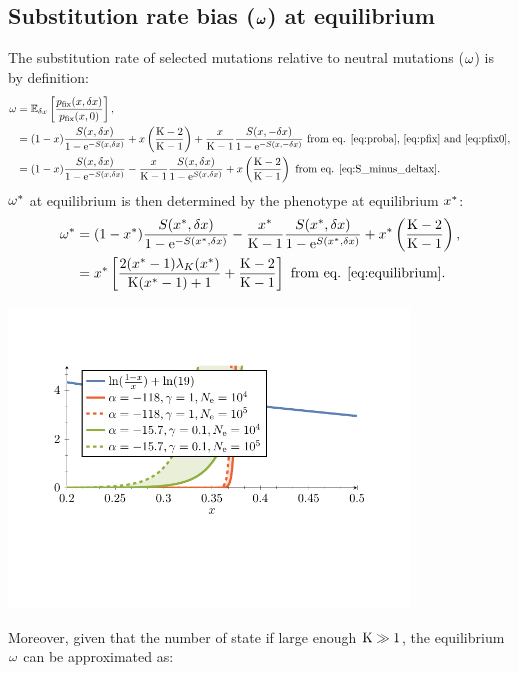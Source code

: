 \documentclass{article}
\begin{document}
\subsection{Substitution rate bias ($\bm{\omega}$) at equilibrium}
The substitution rate of selected mutations relative to neutral mutations ($\omega$) is by definition:
\begin{align}
\omega & = \operatorname{\mathbb{E}}_{\delta x} \left[ \frac{p_{\text{fix}}(x, \delta x)}{p_{\text{fix}}(x, 0)} \right], \\
 & = (1 - x) \frac{ S(x, \delta x)}{1 - \mathrm{e}^{-S(x, \delta x)}} + x \left(\frac{\text{K} - 2}{\text{K} - 1}\right) + \frac{x}{\text{K}-1} \frac{ S(x, -\delta x)}{1 - \mathrm{e}^{-S(x, -\delta x)}} \text{ from eq. \ref{eq:proba}, \ref{eq:pfix} and \ref{eq:pfix0}}, \\
 & = (1 - x) \frac{ S(x, \delta x)}{1 - \mathrm{e}^{-S(x, \delta x)}} - \frac{x}{\text{K}-1}  \frac{ S(x, \delta x)}{1 - \mathrm{e}^{S(x, \delta x)}} +  x \left(\frac{\text{K} - 2}{\text{K} - 1}\right) \text{ from eq. \ref{eq:S_minus_deltax}}.
\end{align}
$\omega^{*}$ at equilibrium is then determined by the phenotype at equilibrium $x^{*}$:
\begin{align}
\omega^{*} &= (1 - x^{*}) \frac{ S(x^{*}, \delta x)}{1 - \mathrm{e}^{-S(x^{*}, \delta x)}} - \frac{x^{*}}{\text{K}-1} \frac{ S(x^{*}, \delta x)}{1 - \mathrm{e}^{S(x^{*}, \delta x)}} + x^{*} \left(\frac{\text{K} - 2}{\text{K} - 1}\right) , \\
 &= x^{*} \left[ \frac{2 (x^{*}-1)  \lambda_{K}(x^{*}) }{\text{K} (x^{*}-1)+1} + \frac{\text{K} - 2}{\text{K} - 1}\right] \text{ from eq. \ref{eq:equilibrium}}.
\end{align}
\begin{center}
 \includegraphics[width=0.8\textwidth, page=2] {figures.pdf}
\end{center}
Moreover, given that the number of state if large enough $\text{K} \gg 1$, the equilibrium $\omega$ can be approximated as:
\end{document}
